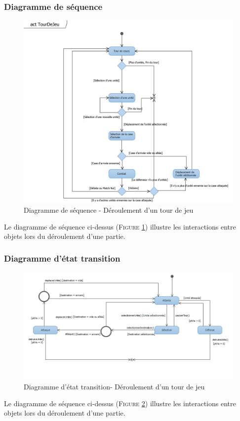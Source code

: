 \documentclass[a4paper,11pt]{article}
\begin{document}
		\subsubsection{Diagramme de séquence}
			\begin{figure}[ht!]
				\includegraphics{Diagrammes/Tour/actTourDeJeu.png}
				\caption{Diagramme de séquence - Déroulement d'un tour de jeu}
				\label{fig:seqtour}
				\end{figure}
			\vspace*{1cm}
			Le diagramme de séquence ci-dessus (\textsc{Figure \ref{fig:seqtour}}) illustre les interactions entre objets lors du déroulement d'une partie.
			\newpage

		\subsubsection{Diagramme d'état transition}
			\begin{figure}[ht!]
				\includegraphics[width=15cm]{Diagrammes/Tour/ettour.png}
				\caption{Diagramme d'état transition- Déroulement d'un tour de jeu}
				\label{fig:ettour}
				\end{figure}
			\vspace*{1cm}
			Le diagramme de séquence ci-dessus (\textsc{Figure \ref{fig:ettour}}) illustre les interactions entre objets lors du déroulement d'une partie.
			\newpage
			
\end{document}
